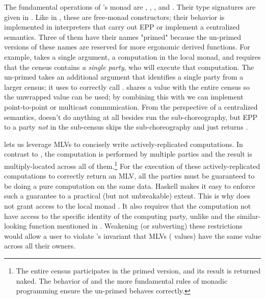 The fundamental operations of \MultiChor's  monad are
, , , and .
Their type signatures are given in .
Like in \HasChor, these are free-monad constructors; their behavior is implemented in interpreters
that carry out EPP or implement a centralized semantics.
Three of them have their names "primed" because the un-primed versions of these names are reserved for more ergonomic derived functions.
For example,  takes a single argument, a computation in the local monad, and requires that the census contains
\emph{a single party}, who will execute that computation.
The un-primed  takes an additional argument that identifies a single party from a larger census;
it uses  to correctly call .
 shares a  value with the entire census so the unwrapped value can be used;
by combining this with  we can implement point-to-point or multicast communication.
From the perspective of a centralized semantics,  doesn't do anything at all besides run
the sub-choreography,
but EPP to a party \emph{not} in the sub-census skips the sub-choreography and just returns .

 lets us leverage MLVs to concisely write actively-replicated computations.
In contrast to , the computation is performed by multiple parties
and the result is multiply-located across all of them.\footnote{
    The entire census participates in the primed version, and its result is returned naked.
    The behavior of  and the more fundamental rules of monadic programming
    ensure the un-primed  behaves correctly.
}
For the execution of these actively-replicated computations to correctly return an MLV,
all the parties must be guaranteed to be doing a pure computation on the same data.
Haskell makes it easy to enforce such a guarantee to a practical (but not unbreakable) extent.
This is why  does not grant access to the local monad .
It also requires that the computation not have access to the specific identity of the computing party,
unlike  and the similar-looking function  mentioned in .
Weakening (or subverting) these restrictions would allow a user to violate \MultiChor's invariant that MLVs ( values)
have the same value across all their owners.

